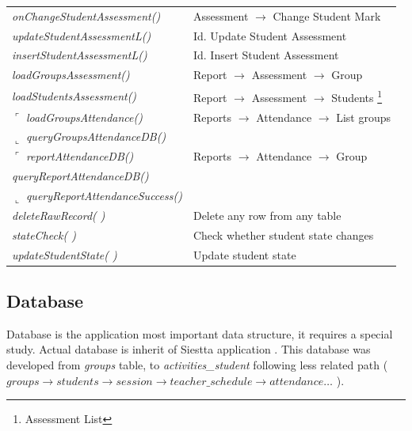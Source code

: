 \begin{bclogo}[couleur=orange!30,logo=\bcbook, arrondi=0.1,ombre=true ]
\begin{tabular}{ll}
\emph { onChangeStudentAssessment() }   & { Assessment  $\rightarrow$  Change Student Mark  } \\
\emph { updateStudentAssessmentL() }    & { Id.  Update Student Assessment} \\
\emph { insertStudentAssessmentL() }    &{  Id.  Insert Student Assessment }\\

\emph{ loadGroupsAssessment() }            & Report $\rightarrow$ Assessment $\rightarrow$  Group\\
\emph{ loadStudentsAssessment() }      & Report $\rightarrow$ Assessment $\rightarrow$   Students \footnote{Assessment List}\\

$\ulcorner$ \emph { loadGroupsAttendance()}         &{ Reports  $\rightarrow$ Attendance  $\rightarrow$ List  groups  } \\
$\llcorner$ \emph { queryGroupsAttendanceDB() }     &  \\

$\ulcorner$ \emph{ reportAttendanceDB()  }              & {  Reports $\rightarrow$  Attendance $\rightarrow$  Group }\\
\emph{ queryReportAttendanceDB() }          &  \\
$\llcorner$\emph{ queryReportAttendanceSuccess()}     &  \\

\emph { deleteRawRecord( ) }            & { Delete any row from any table } \\
\emph { stateCheck( )}                  &{ Check whether student state changes  }\\
\emph { updateStudentState( )}          &{ Update student state } \\

\end{tabular}
\end{bclogo}  
        
\subsection{Database}
Database is the application most important data structure, it requires a special study. Actual database
is inherit of Siestta application \cite{Siestta}. 
 This database was developed from \emph{groups} table,  to \emph{activities\_student} following less related 
 path ( $ groups \rightarrow students \rightarrow session \rightarrow teacher\_schedule \rightarrow attendance \dots $ ).

